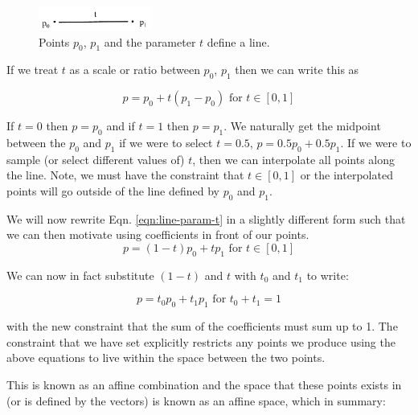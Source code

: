\documentclass[12pt,letterpaper]{article}
\begin{document}
\begin{figure}[!h]
    \begin{center}
        \includegraphics[width=0.33\textwidth]{figures/01_line_param_t}
    \end{center}
    \caption{Points $p_{0}$, $p_{1}$ and the parameter $t$ define a line.}
\end{figure}

If we treat $t$ as a scale or ratio between $p_{0}$, $p_{1}$ then we can write this as

\begin{equation}
\label{eqn:line-param-t}
    p = p_{0} + t(p_{1} - p_{0}) \text{ for } t \in [0, 1]
\end{equation}

If $t = 0$ then $p = p_{0}$ and if $t = 1$ then $p = p_{1}$. We naturally get the midpoint between the $p_{0}$ and $p_{1}$ if we were to select $t = 0.5$, $p = 0.5p_{0}+0.5p_{1}$. If we were to sample (or select different values of) $t$, then we can interpolate all points along the line. Note, we must have the constraint that $t \in [0, 1]$ or the interpolated points will go outside of the line defined by $p_{0}$ and $p_{1}$.

We will now rewrite Eqn. \ref{eqn:line-param-t} in a slightly different form such that we can then motivate using coefficients in front of our points.
\begin{equation}
    p = (1 - t)p_{0} + tp_{1} \text{ for } t \in [0, 1]
\end{equation}

We can now in fact substitute $(1 - t)$ and $t$ with $t_{0}$ and $t_{1}$ to write:

\begin{equation}
    p = t_{0}p_{0} + t_{1}p_{1} \text{ for } t_{0} + t_{1} = 1
\end{equation}

with the new constraint that the sum of the coefficients must sum up to 1. The constraint that we have set explicitly restricts any points we produce using the above equations to live within the space between the two points. 

This is known as an affine combination and the space that these points exists in (or is defined by the vectors) is known as an affine space, which in summary:
\end{document}
